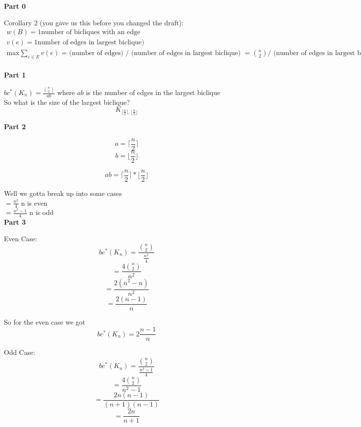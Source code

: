 \documentclass[10pt, AMS Euler]{article}
\begin{document}
\textbf{Part 0}

Corollary 2 (you gave us this before you changed the draft): \\
\begin{align*}
    w(B) = 1 \text{number of bicliques with an edge} \\ 
    v(e) = 1 \text{number of edges in largest biclique)} \\
    \text{max} \sum_{e \in E} v(e) \text{ = (number of edges) / (number of edges in largest biclique) } = \binom{n}{2} \text{/ (number of edges in largest biclique)} \\
\end{align*}

\textbf{Part 1}

$bc^*(K_n) = \frac{\binom{n}{2}}{ab}$ where $ab$ is the number of edges in the largest biclique \\

So what is the size of the largest biclique? \\

$$ K_{\lceil \frac{n}{2} \rceil,  \lfloor \frac{n}{2} \rfloor } $$

\textbf{Part 2}

$$ a = \lceil \frac{n}{2} \rceil $$
$$ b = \lfloor \frac{n}{2} \rfloor $$

$$ ab = \lceil \frac{n}{2} \rceil * \lfloor \frac{n}{2} \rfloor $$

Well we gotta break up into some cases \\

$ = \frac{n^2}{4}$ n is even \\

$ = \frac{n^2-1}{4}$ n is odd \\

\textbf{Part 3}

Even Case: \\

$$ bc^*(K_n) = \frac{\binom{n}{2}}{\frac{n^2}{4}} $$
$$ = \frac{4\binom{n}{2}}{n^2} $$
$$ = \frac{2(n^2-n)}{n^2} $$
$$ = \frac{2(n-1)}{n} $$

So for the even case we got \\

$$ bc^*(K_n) = 2\frac{n-1}{n} $$

Odd Case: \\

$$ bc^*(K_n) = \frac{\binom{n}{2}}{\frac{n^2-1}{4}} $$
$$ = \frac{4\binom{n}{2}}{n^2-1} $$
$$ = \frac{2n(n-1)}{(n+1)(n-1)} $$
$$ = \frac{2n}{n+1} $$
\end{document}
